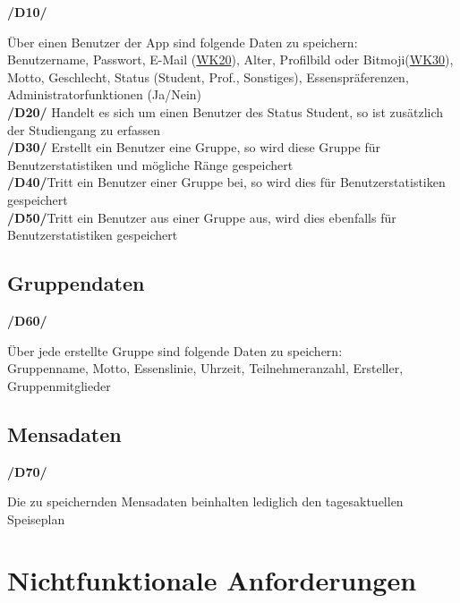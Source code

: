 \documentclass[a4paper]{scrreprt}
\begin{document}
\begin{addmargin}[25pt]{0pt}
\hypertarget{d10}{\textbf{/D10/}} Über einen Benutzer der App sind folgende Daten zu speichern:\\
Benutzername, Passwort, E-Mail (\hyperlink{wk20}{WK20}), Alter, Profilbild oder Bitmoji(\hyperlink{wk30}{WK30}), Motto, Geschlecht, Status (Student, Prof., Sonstiges), Essenspräferenzen, Administratorfunktionen (Ja/Nein)\\
\hypertarget{d20}{\textbf{/D20/}} Handelt es sich um einen Benutzer des Status Student, so ist zusätzlich der Studiengang zu erfassen\\
\hypertarget{d30}{\textbf{/D30/}} Erstellt ein Benutzer eine Gruppe, so wird diese Gruppe für Benutzerstatistiken und mögliche Ränge gespeichert\\
\hypertarget{d40}{\textbf{/D40/}}Tritt ein Benutzer einer Gruppe bei, so wird dies für Benutzerstatistiken gespeichert\\
\hypertarget{d50}{\textbf{/D50/}}Tritt ein Benutzer aus einer Gruppe aus, wird dies ebenfalls für Benutzerstatistiken gespeichert\\


\end{addmargin}

\section{Gruppendaten}

\begin{addmargin}[25pt]{0pt}
\hypertarget{d60}{\textbf{/D60/}} Über jede erstellte Gruppe sind folgende Daten zu speichern:\\
Gruppenname, Motto, Essenslinie, Uhrzeit, Teilnehmeranzahl, Ersteller, Gruppenmitglieder\\
\end{addmargin}

\section{Mensadaten}

\begin{addmargin}[25pt]{0pt}
\hypertarget{d70}{\textbf{/D70/}} Die zu speichernden Mensadaten beinhalten lediglich den tagesaktuellen Speiseplan\\
\end{addmargin}



\chapter{Nichtfunktionale Anforderungen}
\end{document}
